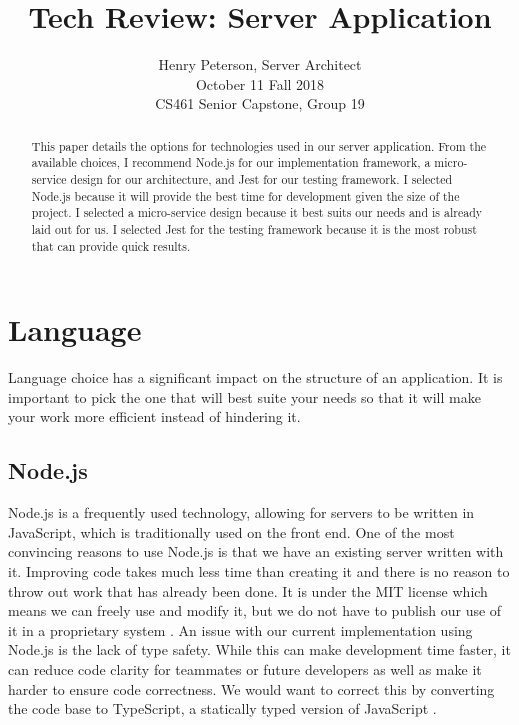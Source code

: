 \documentclass[draftclsnofoot,onecolumn,10pt]{IEEEtran}
\title{Tech Review: Server Application}
\author{Henry Peterson, Server Architect \\
        October 11 Fall 2018 \\
        CS461 Senior Capstone, Group 19 }
\begin{document}
	\maketitle

	\begin{abstract}
        This paper details the options for technologies used in our server application. From the available choices, I recommend Node.js for our implementation framework, a micro-service design for our architecture, and Jest for our testing framework. I selected Node.js because it will provide the best time for development given the size of the project. I selected a micro-service design because it best suits our needs and is already laid out for us. I selected Jest for the testing framework because it is the most robust that can provide quick results.
	\end{abstract}
	\pagebreak
    \tableofcontents
	\pagebreak

	\section{Language}
        Language choice has a significant impact on the structure of an application. It is important to pick the one that will best suite your needs so that it will make your work more efficient instead of hindering it.
        \subsection{Node.js}
            Node.js \cite{nodejs} is a frequently used technology, allowing for servers to be written in JavaScript, which is traditionally used on the front end.
                One of the most convincing reasons to use Node.js is that we have an existing server written with it. Improving code takes much less time than creating it and there is no reason to throw out work that has already been done. It is under the MIT license which means we can freely use and modify it, but we do not have to publish our use of it in a proprietary system \cite{mit}. An issue with our current implementation using Node.js is the lack of type safety. While this can make development time faster, it can reduce code clarity for teammates or future developers as well as make it harder to ensure code correctness. We would want to correct this by converting the code base to TypeScript, a statically typed version of JavaScript \cite{tsvsjs}.
\end{document}

